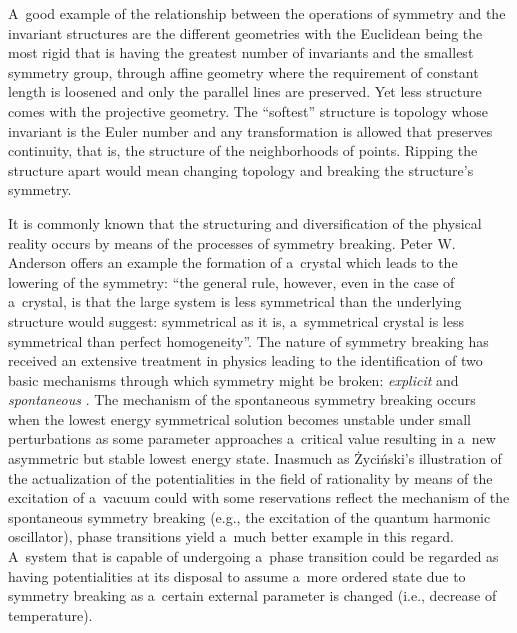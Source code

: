 A~good example of the relationship between the operations of symmetry and the invariant structures are the different geometries with the Euclidean being the most rigid that is having the greatest number of invariants and the smallest symmetry group, through affine geometry where the requirement of constant length is loosened and only the parallel lines are preserved. Yet less structure comes with the projective geometry. The ``softest'' structure is topology whose invariant is the Euler number and any transformation is allowed that preserves continuity, that is, the structure of the neighborhoods of points. Ripping the structure apart would mean changing topology and breaking the structure's symmetry.



It is commonly known that the structuring and diversification of the physical reality occurs by means of the processes of symmetry breaking. Peter W. Anderson 
\parencite*[][p.395]{anderson_more_1972} %
 offers an example the formation of a~crystal which leads to the lowering of the symmetry: ``the general rule, however, even in the case of a~crystal, is that the large system is less symmetrical than the underlying structure would suggest: symmetrical as it is, a~symmetrical crystal is less symmetrical than perfect homogeneity''. The nature of symmetry breaking has received an extensive treatment in physics leading to the identification of two basic mechanisms through which symmetry might be broken: \textit{explicit} and \textit{spontaneous} 
\parencite[e.g][]{brading_meaning_2003}. %
 The mechanism of the spontaneous symmetry breaking occurs when the lowest energy symmetrical solution becomes unstable under small perturbations as some parameter approaches a~critical value resulting in a~new asymmetric but stable lowest energy state. Inasmuch as Życiński's illustration of the actualization of the potentialities in the field of rationality by means of the excitation of a~vacuum could with some reservations reflect the mechanism of the spontaneous symmetry breaking (e.g., the excitation of the quantum harmonic oscillator), phase transitions yield a~much better example in this regard. A~system that is capable of undergoing a~phase transition could be regarded as having potentialities at its disposal to assume a~more ordered state due to symmetry breaking as a~certain external parameter is changed (i.e., decrease of temperature).



